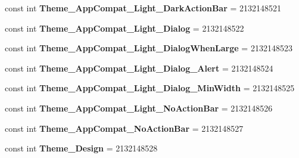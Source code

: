 \begin{DoxyCompactItemize}
\item 
\mbox{\label{classst_delivery_1_1_resource_1_1_style_a5326cbfca68a46a070402a1c036df092}} 
const int {\bfseries Theme\+\_\+\+App\+Compat\+\_\+\+Light\+\_\+\+Dark\+Action\+Bar} = 2132148521
\item 
\mbox{\label{classst_delivery_1_1_resource_1_1_style_af8804a7a5099782d18d19f2838dceb3e}} 
const int {\bfseries Theme\+\_\+\+App\+Compat\+\_\+\+Light\+\_\+\+Dialog} = 2132148522
\item 
\mbox{\label{classst_delivery_1_1_resource_1_1_style_a5a0972ed5b88f5ef286e75d2c00bd066}} 
const int {\bfseries Theme\+\_\+\+App\+Compat\+\_\+\+Light\+\_\+\+Dialog\+When\+Large} = 2132148523
\item 
\mbox{\label{classst_delivery_1_1_resource_1_1_style_a325690b51e22155d3bb7d96e72373267}} 
const int {\bfseries Theme\+\_\+\+App\+Compat\+\_\+\+Light\+\_\+\+Dialog\+\_\+\+Alert} = 2132148524
\item 
\mbox{\label{classst_delivery_1_1_resource_1_1_style_a30eb612c1e6166594ef7644f1685b8a0}} 
const int {\bfseries Theme\+\_\+\+App\+Compat\+\_\+\+Light\+\_\+\+Dialog\+\_\+\+Min\+Width} = 2132148525
\item 
\mbox{\label{classst_delivery_1_1_resource_1_1_style_a27d630d5d90df23c5b3c2182aa44e085}} 
const int {\bfseries Theme\+\_\+\+App\+Compat\+\_\+\+Light\+\_\+\+No\+Action\+Bar} = 2132148526
\item 
\mbox{\label{classst_delivery_1_1_resource_1_1_style_a91da5da120ed16c51c75614c38a154ff}} 
const int {\bfseries Theme\+\_\+\+App\+Compat\+\_\+\+No\+Action\+Bar} = 2132148527
\item 
\mbox{\label{classst_delivery_1_1_resource_1_1_style_a6f6d56538faaacd114b8bbb7eaf0ff11}} 
const int {\bfseries Theme\+\_\+\+Design} = 2132148528
\item 
\mbox{\label{classst_delivery_1_1_resource_1_1_style_ae01d0040699e74bdca1b93ed0f8eca70}} 

\end{DoxyCompactItemize}
